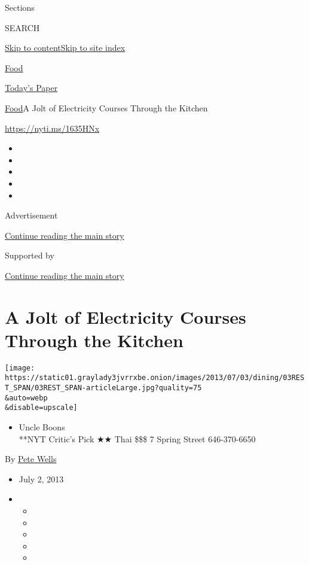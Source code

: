 Sections

SEARCH

\protect\hyperlink{site-content}{Skip to
content}\protect\hyperlink{site-index}{Skip to site index}

\href{https://www.nytimes3xbfgragh.onion/section/food}{Food}

\href{https://myaccount.nytimes3xbfgragh.onion/auth/login?response_type=cookie\&client_id=vi}{}

\href{https://www.nytimes3xbfgragh.onion/section/todayspaper}{Today's
Paper}

\href{/section/food}{Food}\textbar{}A Jolt of Electricity Courses
Through the Kitchen

\url{https://nyti.ms/1635HNx}

\begin{itemize}
\item
\item
\item
\item
\item
\end{itemize}

Advertisement

\protect\hyperlink{after-top}{Continue reading the main story}

Supported by

\protect\hyperlink{after-sponsor}{Continue reading the main story}

\hypertarget{a-jolt-of-electricity-courses-through-the-kitchen}{%
\section{A Jolt of Electricity Courses Through the
Kitchen}\label{a-jolt-of-electricity-courses-through-the-kitchen}}

\texttt{[image: https://static01.graylady3jvrrxbe.onion/images/2013/07/03/dining/03REST\_SPAN/03REST\_SPAN-articleLarge.jpg?quality=75\\\&auto=webp\\\&disable=upscale]}

\begin{itemize}
\tightlist
\item
  Uncle Boons\\
  **NYT Critic's Pick ★★ Thai \$\$\$ 7 Spring Street 646-370-6650
\end{itemize}

By \href{https://www.nytimes3xbfgragh.onion/by/pete-wells}{Pete Wells}

\begin{itemize}
\item
  July 2, 2013
\item
  \begin{itemize}
  \item
  \item
  \item
  \item
  \item
  \end{itemize}
\end{itemize}


